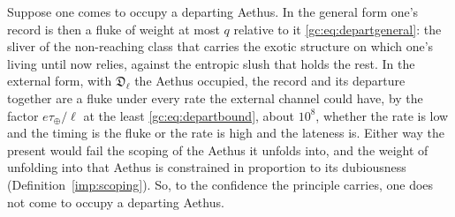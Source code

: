 \begin{remark}\label{gc:rem:departures}
Suppose one comes to occupy a departing Aethus. In the general form
one's record is then a fluke of weight at most $q$ relative to it
\eqref{gc:eq:departgeneral}: the sliver of the non-reaching class that
carries the exotic structure on which one's living until now relies,
against the entropic slush that holds the rest. In the external form,
with $\mathfrak D_\ell$ the Aethus occupied, the record and its
departure together are a fluke under every rate the external channel
could have, by the factor $e\tau_\oplus/\ell$ at the least
\eqref{gc:eq:departbound}, about $10^{8}$, whether the rate is low and the
timing is the fluke or the rate is high and the lateness is. Either way
the present would fail the scoping of the Aethus it unfolds into, and the
weight of unfolding into that Aethus is constrained in proportion to its
dubiousness (Definition~\ref{imp:scoping}). So, to the confidence the
principle carries, one does not come to occupy a departing Aethus.


\end{remark}
